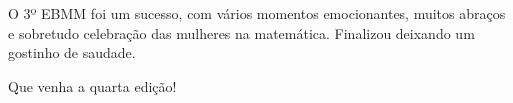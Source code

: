 \documentclass{hipatia}
\begin{document}
O 3º EBMM foi um sucesso, com vários momentos emocionantes, muitos abraços e sobretudo celebração das mulheres na matemática. Finalizou deixando um gostinho de saudade.

Que venha a quarta edição!


 


 


 

\end{document}

